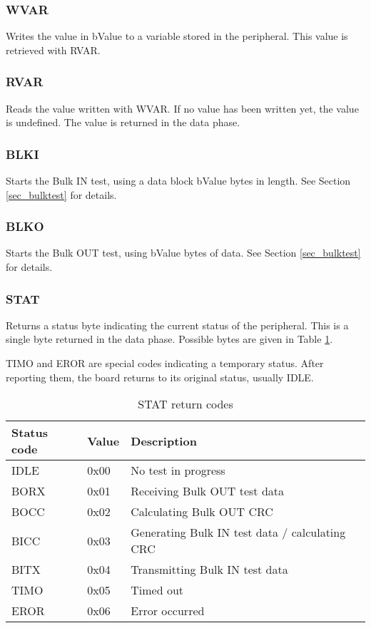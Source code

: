 \documentclass[a4paper]{book}
\begin{document}
\subsubsection{WVAR}

Writes the value in bValue to a variable stored in the peripheral.  This value is retrieved with RVAR.

\subsubsection{RVAR}

Reads the value written with WVAR.  If no value has been written yet, the value is undefined.  The value is returned in the data phase.

\subsubsection{BLKI}

Starts the Bulk IN test, using a data block bValue bytes in length.  See Section \ref{sec_bulktest} for details.

\subsubsection{BLKO}

Starts the Bulk OUT test, using bValue bytes of data.  See Section \ref{sec_bulktest} for details.

\subsubsection{STAT}

Returns a status byte indicating the current status of the peripheral.  This is a single byte returned in the data phase.  Possible bytes are given in Table \ref{tbl_stat_return_codes}.

TIMO and EROR are special codes indicating a temporary status.  After reporting them, the board returns to its original status, usually IDLE.

\begin{table}
\begin{tabularx}{\textwidth}{|l|l|X|}
\hline
Status code & Value & Description \\ 
\hline
\hline
IDLE & 0x00 & No test in progress \\ 
\hline
BORX & 0x01 & Receiving Bulk OUT test data \\ 
\hline
BOCC & 0x02 & Calculating Bulk OUT CRC \\ 
\hline
BICC & 0x03 & Generating Bulk IN test data / calculating CRC \\ 
\hline
BITX & 0x04 & Transmitting Bulk IN test data \\ 
\hline
TIMO & 0x05 & Timed out \\ 
\hline
EROR & 0x06 & Error occurred \\
\hline
\end{tabularx}
\caption{STAT return codes}
\label{tbl_stat_return_codes}
\end{table}
\end{document}
